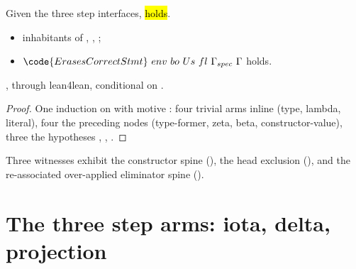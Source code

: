 \begin{theorem}
\label{thm:erases_correct_of_steps}
\leanok
{}
 Given the three step interfaces, \hl{ holds}.
\begin{itemize}
\item {} inhabitants of , , ;
\item {} $\code{ErasesCorrectStmt}\ env\ bo\ Us\ fl\ \Gamma_{spec}\ \Gamma$ holds.
\end{itemize}
 \stProved{}, \stInherited{} through lean4lean, conditional on \stAssumed{}
.
\end{theorem}
\begin{proof}
\leanok
{}
 One induction on \SEval{} with motive : four trivial arms inline (type,
lambda, literal), four the preceding nodes (type-former, zeta, beta, constructor-value), three the
hypotheses , , .
\end{proof}

\begin{remark}
 Three witnesses exhibit the constructor spine (), the
head exclusion (), and the re-associated over-applied eliminator spine
().
\end{remark}

\section{The three step arms: iota, delta, projection}
\label{sec:correctness:steps}

